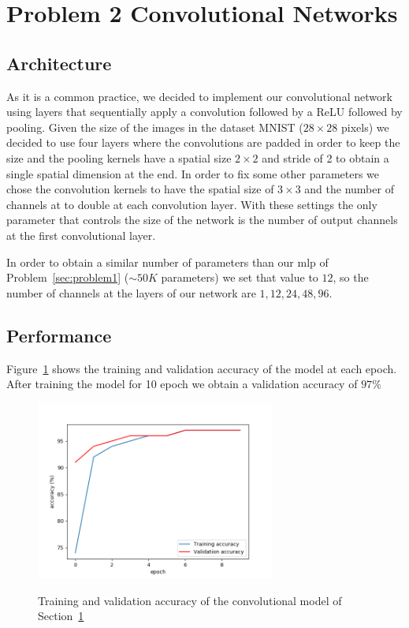 \documentclass[a4paper]{article}
\begin{document}
\section{Problem 2 Convolutional Networks}
\label{sec:problem2}
\subsection{Architecture}
As it is a common practice, we decided to implement our convolutional network using layers that sequentially apply a convolution followed by a ReLU followed by pooling.
Given the size of the images in the dataset MNIST ($28\times28$ pixels) we decided to use four layers where the convolutions are padded in order to keep the size and the pooling kernels have a spatial size $2\times2$ and stride of 2 to obtain a single spatial dimension at the end. In order to fix some other parameters we chose the convolution kernels to have the spatial size of $3\times3$ and the number of channels at to double at each convolution layer. With these settings the only parameter that controls the size of the network is the number of output channels at the first convolutional layer. 

In order to obtain a similar number of parameters than our mlp of Problem~\ref{sec:problem1} ($\sim50K$ parameters) we set that value to $12$, so the number of channels at the layers of our network are  $1,12,24,48,96$. 
\subsection{Performance}
Figure~\ref{fig:CNN_accuracy} shows the training and validation accuracy of the model at each epoch. After training the model for 10 epoch we obtain a validation accuracy of $97\%$

\begin{figure}[h!]
\centering
\includegraphics[width=0.7\textwidth]{P2_CNN_accuracy}
\label{fig:CNN_accuracy}
\caption{Training and validation accuracy of the convolutional model of Section~\ref{sec:problem2}}
\end{figure}
\end{document}
